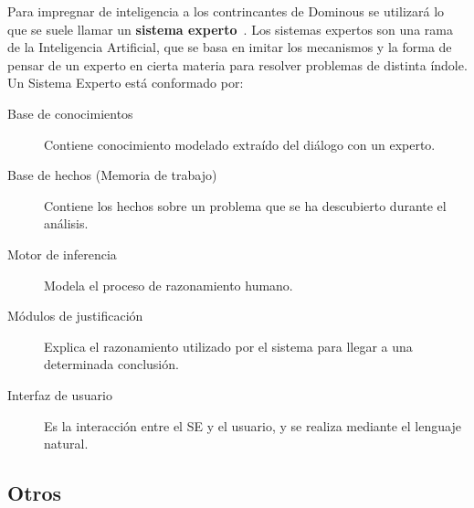 Para impregnar de inteligencia a los contrincantes de Dominous se utilizará lo que se suele llamar un \textbf{sistema experto}~\cite{Giarratano:1989:ESP:583478}.
Los sistemas expertos son una rama de la Inteligencia Artificial, que se basa en imitar los mecanismos y la forma de
pensar de un experto en cierta materia para resolver problemas de distinta índole.\\

Un Sistema Experto está conformado por:
\begin{description}
    \item[Base de conocimientos] Contiene conocimiento modelado extraído del diálogo con un experto.
    \item[Base de hechos (Memoria de trabajo)] Contiene los hechos sobre un problema que se ha descubierto durante el análisis.
    \item[Motor de inferencia] Modela el proceso de razonamiento humano.
    \item[Módulos de justificación] Explica el razonamiento utilizado por el sistema para llegar a una determinada conclusión.
    \item[Interfaz de usuario] Es la interacción entre el SE y el usuario, y se realiza mediante el lenguaje natural.
\end{description}

\subsection{Otros}

